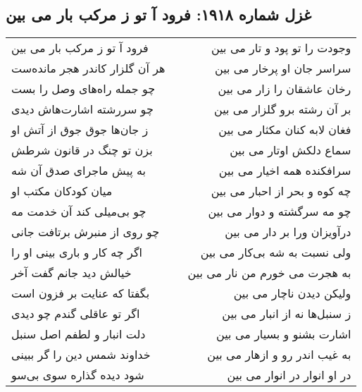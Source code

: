 \begin{center}
\section*{غزل شماره ۱۹۱۸: فرود آ تو ز مرکب بار می بین}
\label{sec:1918}
\begin{longtable}{l p{0.5cm} r}
فرود آ تو ز مرکب بار می بین
&&
وجودت را تو پود و تار می بین
\\
هر آن گلزار کاندر هجر مانده‌ست
&&
سراسر جان او پرخار می بین
\\
چو جمله راه‌های وصل را بست
&&
رخان عاشقان را زار می بین
\\
چو سررشته اشارت‌هاش دیدی
&&
بر آن رشته برو گلزار می بین
\\
ز جان‌ها جوق جوق از آتش او
&&
فغان لابه کنان مکثار می بین
\\
بزن تو چنگ در قانون شرطش
&&
سماع دلکش اوتار می بین
\\
به پیش ماجرای صدق آن شه
&&
سرافکنده همه اخیار می بین
\\
میان کودکان مکتب او
&&
چه کوه و بحر از احبار می بین
\\
چو بی‌میلی کند آن خدمت مه
&&
چو مه سرگشته و دوار می بین
\\
چو روی از منبرش برتافت جانی
&&
درآویزان ورا بر دار می بین
\\
اگر چه کار و باری بینی او را
&&
ولی نسبت به شه بی‌کار می بین
\\
خیالش دید جانم گفت آخر
&&
به هجرت می خورم من نار می بین
\\
بگفتا که عنایت بر فزون است
&&
ولیکن دیدن ناچار می بین
\\
اگر تو عاقلی گندم چو دیدی
&&
ز سنبل‌ها نه از انبار می بین
\\
دلت انبار و لطفم اصل سنبل
&&
اشارت بشنو و بسیار می بین
\\
خداوند شمس دین را گر ببینی
&&
به غیب اندر رو و ازهار می بین
\\
شود دیده گذاره سوی بی‌سو
&&
در او انوار در انوار می بین
\\
\end{longtable}
\end{center}
